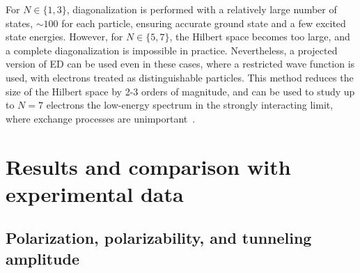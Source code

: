 \documentclass[aps, prb, floatfix, twocolumn, notitlepage, superscriptaddress, 10pt]{revtex4-2}
\newcommand{\1}{{1\hspace*{-0.5ex} \textrm{l} \hspace*{0.5ex}}}
\begin{document}
For $N\in \{ 1,3\}$,  diagonalization is performed with a relatively large number of states,  $\sim 100$ for each particle, 
ensuring accurate ground state and a few excited state energies. However, for $N\in \{5,7\}$, the Hilbert space 
becomes too large, and a complete diagonalization  is impossible in practice. 
Nevertheless, a projected version of ED can be used even in these cases, 
where a restricted wave function is used, with electrons treated as distinguishable particles. 
This method reduces the size 
of the Hilbert space by 2-3 orders of magnitude, and can be used to study  up to $N=7$ electrons
 the low-energy spectrum  in the strongly interacting limit, 
where exchange processes are unimportant~\cite{SIMON1984101}. 


\section{Results and comparison with experimental data}
\label{sec:comparison}

\subsection{Polarization, polarizability, and tunneling amplitude}
\end{document}
